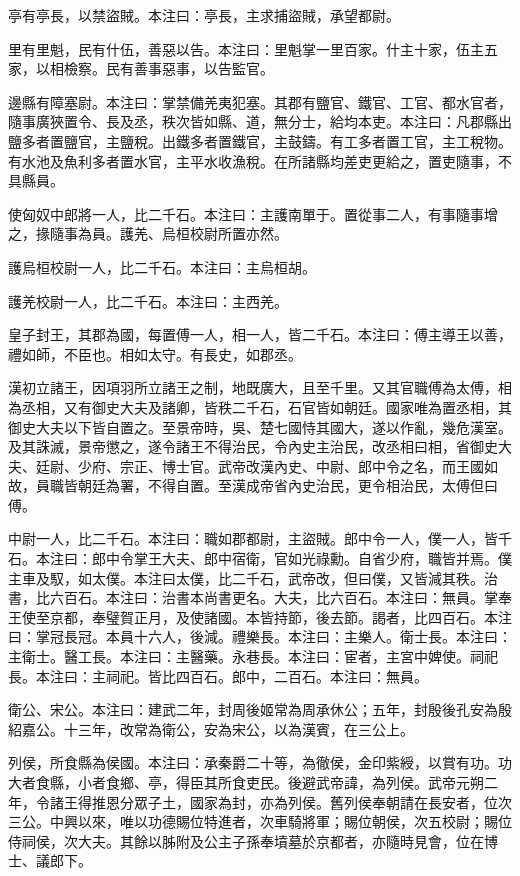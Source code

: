 \begin{pinyinscope}
亭有亭長，以禁盜賊。本注曰：亭長，主求捕盜賊，承望都尉。

里有里魁，民有什伍，善惡以告。本注曰：里魁掌一里百家。什主十家，伍主五家，以相檢察。民有善事惡事，以告監官。

邊縣有障塞尉。本注曰：掌禁備羌夷犯塞。其郡有鹽官、鐵官、工官、都水官者，隨事廣狹置令、長及丞，秩次皆如縣、道，無分士，給均本吏。本注曰：凡郡縣出鹽多者置鹽官，主鹽稅。出鐵多者置鐵官，主鼓鑄。有工多者置工官，主工稅物。有水池及魚利多者置水官，主平水收漁稅。在所諸縣均差吏更給之，置吏隨事，不具縣員。

使匈奴中郎將一人，比二千石。本注曰：主護南單于。置從事二人，有事隨事增之，掾隨事為員。護羌、烏桓校尉所置亦然。

護烏桓校尉一人，比二千石。本注曰：主烏桓胡。

護羌校尉一人，比二千石。本注曰：主西羌。

皇子封王，其郡為國，每置傅一人，相一人，皆二千石。本注曰：傅主導王以善，禮如師，不臣也。相如太守。有長史，如郡丞。

漢初立諸王，因項羽所立諸王之制，地既廣大，且至千里。又其官職傅為太傅，相為丞相，又有御史大夫及諸卿，皆秩二千石，石官皆如朝廷。國家唯為置丞相，其御史大夫以下皆自置之。至景帝時，吳、楚七國恃其國大，遂以作亂，幾危漢室。及其誅滅，景帝懲之，遂令諸王不得治民，令內史主治民，改丞相曰相，省御史大夫、廷尉、少府、宗正、博士官。武帝改漢內史、中尉、郎中令之名，而王國如故，員職皆朝廷為署，不得自置。至漢成帝省內史治民，更令相治民，太傅但曰傅。

中尉一人，比二千石。本注曰：職如郡都尉，主盜賊。郎中令一人，僕一人，皆千石。本注曰：郎中令掌王大夫、郎中宿衛，官如光祿勳。自省少府，職皆并焉。僕主車及馭，如太僕。本注曰太僕，比二千石，武帝改，但曰僕，又皆減其秩。治書，比六百石。本注曰：治書本尚書更名。大夫，比六百石。本注曰：無員。掌奉王使至京都，奉璧賀正月，及使諸國。本皆持節，後去節。謁者，比四百石。本注曰：掌冠長冠。本員十六人，後減。禮樂長。本注曰：主樂人。衛士長。本注曰：主衛士。醫工長。本注曰：主醫藥。永巷長。本注曰：宦者，主宮中婢使。祠祀長。本注曰：主祠祀。皆比四百石。郎中，二百石。本注曰：無員。

衛公、宋公。本注曰：建武二年，封周後姬常為周承休公；五年，封殷後孔安為殷紹嘉公。十三年，改常為衛公，安為宋公，以為漢賓，在三公上。

列侯，所食縣為侯國。本注曰：承秦爵二十等，為徹侯，金印紫綬，以賞有功。功大者食縣，小者食鄉、亭，得臣其所食吏民。後避武帝諱，為列侯。武帝元朔二年，令諸王得推恩分眾子土，國家為封，亦為列侯。舊列侯奉朝請在長安者，位次三公。中興以來，唯以功德賜位特進者，次車騎將軍；賜位朝侯，次五校尉；賜位侍祠侯，次大夫。其餘以胏附及公主子孫奉墳墓於京都者，亦隨時見會，位在博士、議郎下。


\end{pinyinscope}

